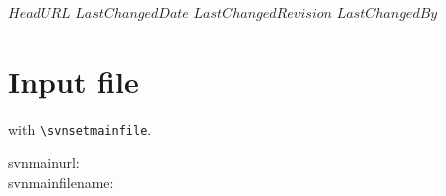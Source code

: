 \svnidlong
{$HeadURL$}
{$LastChangedDate$}
{$LastChangedRevision$}
{$LastChangedBy$}

\noindent

\section{Input file}
with \verb+\svnsetmainfile+.
\svnsetmainfile

svnmainurl: \svnnolinkurl{\svnmainurl} \\
svnmainfilename: \svnnolinkurl{\svnmainfilename} \\

